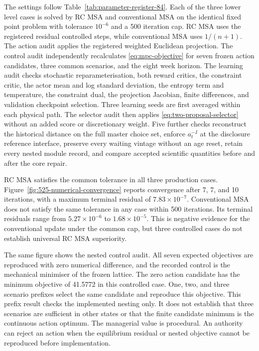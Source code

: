 \documentclass[a4paper,fleqn]{cas-sc}
\begin{document}
The settings follow Table~\ref{tab:parameter-register-84}. Each of the three
lower level cases is solved by RC MSA and conventional MSA on the identical
fixed point problem with tolerance $10^{-6}$ and a 500 iteration cap. RC MSA
uses the registered residual controlled steps, while conventional MSA uses
$1/(n+1)$. The action audit applies the registered weighted Euclidean
projection. The control audit independently recalculates
\cref{eq:mpc-objective} for seven frozen action candidates, three common
scenarios, and the eight week horizon. The learning audit checks stochastic
reparameterisation, both reward critics, the constraint critic, the actor mean
and log standard deviation, the entropy term and temperature, the constraint
dual, the projection Jacobian, finite differences, and validation checkpoint
selection. Three learning seeds are first averaged within each physical path.
The selector audit then applies \cref{eq:two-proposal-selector} without an added
score or discretionary weight. Five further checks reconstruct the historical
distance on the full master choice set, enforce $a_t^{-I}$ at the disclosure
reference interface, preserve every waiting vintage without an age reset,
retain every nested module record, and compare accepted scientific quantities
before and after the core repair.

RC MSA satisfies the common tolerance in all three production cases.
Figure~\ref{fig:525-numerical-convergence} reports convergence after 7, 7, and
10 iterations, with a maximum terminal residual of
$7.83\times10^{-7}$. Conventional MSA does not satisfy the same tolerance in
any case within 500 iterations. Its terminal residuals range from
$5.27\times10^{-6}$ to $1.68\times10^{-5}$. This is negative evidence for the
conventional update under the common cap, but three controlled cases do not
establish universal RC MSA superiority.

The same figure shows the nested control audit. All seven expected objectives
are reproduced with zero numerical difference, and the recorded control is the
mechanical minimiser of the frozen lattice. The zero action candidate has the
minimum objective of 41.5772 in this controlled case. One, two, and three
scenario prefixes select the same candidate and reproduce this objective. This
prefix result checks the implemented nesting only. It does not establish that
three scenarios are sufficient in other states or that the finite candidate
minimum is the continuous action optimum. The managerial value is procedural.
An authority can reject an action when the equilibrium residual or nested
objective cannot be reproduced before implementation.
\end{document}
